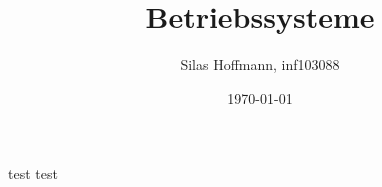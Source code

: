 \documentclass{article}
\title{Betriebssysteme}
\author{Silas Hoffmann, inf103088}
\date{\today}
\begin{document}
\maketitle
\vspace{0.5cm}
\tableofcontents
\clearpage


test test
\end{document}
